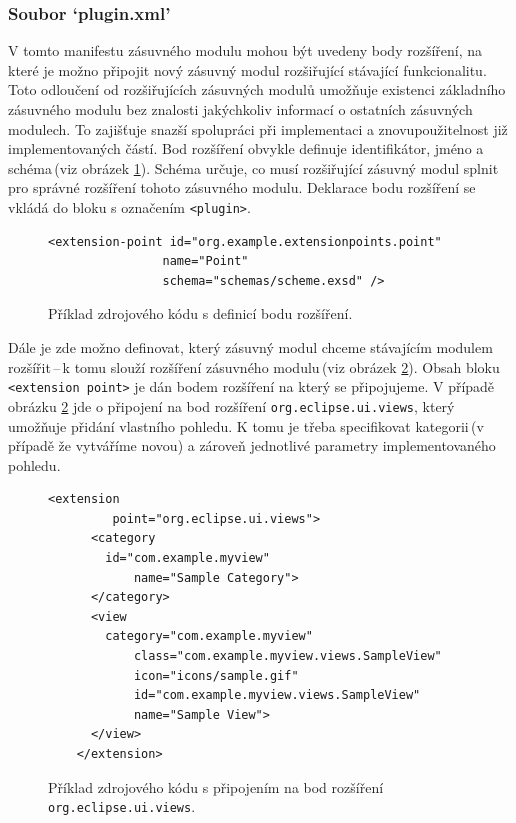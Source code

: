       \subsubsection{Soubor `plugin.xml'}
      V tomto manifestu zásuvného modulu mohou být uvedeny body rozšíření, na které je možno připojit nový zásuvný modul rozšiřující stávající funkcionalitu. Toto odloučení od rozšiřujících zásuvných modulů umožňuje existenci základního zásuvného modulu bez znalosti jakýchkoliv informací o ostatních zásuvných modulech. To zajišťuje snazší spolupráci při implementaci a znovupoužitelnost již implementovaných částí. Bod rozšíření obvykle definuje identifikátor, jméno a schéma\,(viz obrázek \ref{code:extension_point_declaration}). Schéma určuje, co musí rozšiřující zásuvný modul splnit pro správné rozšíření tohoto zásuvného modulu. Deklarace bodu rozšíření se vkládá do bloku s označením \texttt{<plugin>}. 
      
      \lstset{language=xml}
      \begin{figure}[h]
	\begin{lstlisting}[frame=single]
	  <extension-point id="org.example.extensionpoints.point"
                name="Point"
                schema="schemas/scheme.exsd" />
	\end{lstlisting}
	\caption{Příklad zdrojového kódu s definicí bodu rozšíření.}
	\label{code:extension_point_declaration}
      \end{figure}
      
      Dále je zde možno definovat, který zásuvný modul chceme stávajícím modulem rozšířit\,--\,k tomu slouží rozšíření zásuvného modulu\,(viz obrázek \ref{code:extension_declaration}). Obsah bloku \texttt{<extension point>} je dán bodem rozšíření na který se připojujeme. V případě obrázku \ref{code:extension_declaration} jde o připojení na bod rozšíření \texttt{org.eclipse.ui.views}, který umožňuje přidání vlastního pohledu. K tomu je třeba specifikovat kategorii\,(v případě že vytváříme novou) a zároveň jednotlivé parametry implementovaného pohledu.
      
      \begin{figure}[h]
	\begin{lstlisting}[frame=single]
	  <extension
         point="org.eclipse.ui.views">
	  <category
	    id="com.example.myview"
            name="Sample Category">
	  </category>
	  <view
	    category="com.example.myview"
            class="com.example.myview.views.SampleView"
            icon="icons/sample.gif"
            id="com.example.myview.views.SampleView"
            name="Sample View">
	  </view>
	</extension>
	\end{lstlisting}
	\caption{Příklad zdrojového kódu s připojením na bod rozšíření \texttt{org.eclipse.ui.views}.}
	\label{code:extension_declaration}
      \end{figure}